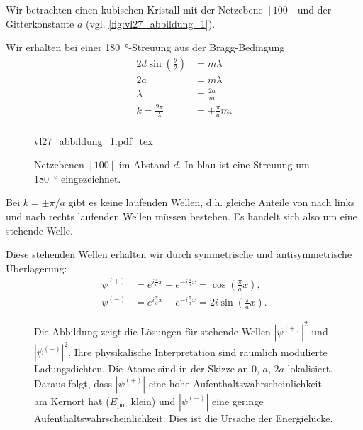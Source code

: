 Wir betrachten einen kubischen Kristall mit der Netzebene $[100]$ und der Gitterkonstante $a$ (vgl. \autoref{fig:vl27_abbildung_1}).\\[1ex]
\begin{minipage}{0.5\linewidth}
	Wir erhalten bei einer \SI{180}{\degree}-Streuung aus der Bragg-Bedingung
	$$
	\begin{aligned}
		2d \sin\left( \frac{\theta}{2} \right) &= m \lambda \\
		2a &= m \lambda \\
		\lambda &= \frac{2a}{m} \\
		k = \frac{2\pi}{\lambda} &= \pm \frac{\pi}{a} m .\\
	\end{aligned}
	$$ 
\end{minipage}
\begin{minipage}{0.5\linewidth}
	\begin{figure}[H]
		\centering
		\def\svgwidth{.386\columnwidth}
		{vl27_abbildung_1.pdf_tex}
		\caption{Netzebenen $[100]$ im Abstand $d$. In blau ist eine Streuung um \SI{180}{\degree} eingezeichnet.}
		\label{fig:vl27_abbildung_1}
	\end{figure}
\end{minipage}

Bei $k=\pm \pi /a$ gibt es keine laufenden Wellen, d.h. gleiche Anteile von nach links und nach rechts laufenden Wellen müssen bestehen. Es handelt sich also um eine stehende Welle.

Diese stehenden Wellen erhalten wir durch symmetrische und antisymmetrische Überlagerung:
$$
\begin{aligned}
	\psi^{(+)} &= e^{i \frac{\pi}{a} x} + e^{- i \frac{\pi}{a} x} = \cos\left( \frac{\pi}{a} x \right),  \\
	\psi^{(-)} &= e^{i\frac{\pi}{a} x} - e^{-i \frac{\pi}{a} x} = 2i \sin \left( \frac{\pi}{a}x \right).  
\end{aligned}
$$ 

\begin{figure}[H]
    \centering
	\caption{Die Abbildung zeigt die Lösungen für stehende Wellen $|\psi^{(+)}|^2$ und $|\psi^{(-)}|^2$. 
		Ihre physikalische Interpretation sind räumlich modulierte Ladungsdichten.
		Die Atome sind in der Skizze an 0, $a$, $2a$ lokalisiert.
		Daraus folgt, dass $|\psi^{(+)}|$ eine hohe Aufenthaltswahrscheinlichkeit am Kernort hat ($E_\mathrm{pot}$ klein) und $|\psi^{(-)}|$ eine geringe Aufenthaltswahrscheinlichkeit.
		Dies ist die Ursache der Energielücke.
	}
    \label{fig:vl27_abbildung_2}
\end{figure}

